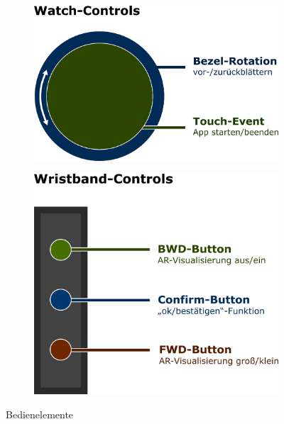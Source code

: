 \documentclass[11pt, a4paper]{article}
\begin{document}
\begin{figure}[h]
	\begin{subfigure}[c]{0.4\textwidth}
        \centering
		\includegraphics[scale=.4]{doc/assets/WatchControls.png}
	\end{subfigure}
	\begin{subfigure}[c]{0.5\textwidth}
        \centering
		\includegraphics[scale=.4]{doc/assets/WristbandControls.png}
	\end{subfigure}
    \centering
	\caption{Bedienelemente}
    \label{fig:controls}
\end{figure}

\newpage
\end{document}
